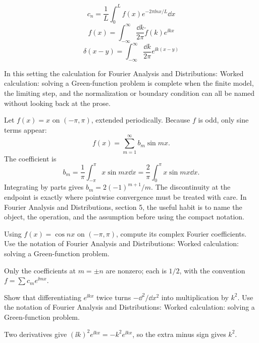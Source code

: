 \[
  c_n=\frac1L\int_0^L f(x)e^{-2\pi\ii nx/L}\dd x
\]
\[
  f(x)=\int_{-\infty}^{\infty}\frac{\dd k}{2\pi}\tilde f(k)e^{\ii kx}
\]
\[
  \delta(x-y)=\int_{-\infty}^{\infty}\frac{\dd k}{2\pi}e^{\ii k(x-y)}
\]

In this setting the calculation for Fourier Analysis and Distributions: Worked calculation: solving a Green-function problem is complete when the finite model, the limiting step, and the normalization or boundary condition can all be named without looking back at the prose.




\begin{example}
Let \(f(x)=x\) on \((-\pi,\pi)\), extended periodically.  Because \(f\) is odd, only sine terms appear:
\[
  f(x)=\sum_{m=1}^\infty b_m\sin mx.
\]
The coefficient is
\[
  b_m=\frac1\pi\int_{-\pi}^\pi x\sin mx\dd x
  =\frac2\pi\int_0^\pi x\sin mx\dd x.
\]
Integrating by parts gives \(b_m=2(-1)^{m+1}/m\).  The discontinuity at the endpoint is exactly where pointwise convergence must be treated with care.  In Fourier Analysis and Distributions, section 5, the useful habit is to name the object, the operation, and the assumption before using the compact notation.
\end{example}



\begin{exercise}
Using \(f(x)=\cos nx\) on \((-\pi,\pi)\), compute its complex Fourier coefficients.  Use the notation of Fourier Analysis and Distributions: Worked calculation: solving a Green-function problem.
\begin{answer}
Only the coefficients at \(m=\pm n\) are nonzero; each is \(1/2\), with the convention \(f=\sum c_me^{\ii mx}\).
\end{answer}
\end{exercise}

\begin{exercise}
Show that differentiating \(e^{\ii kx}\) twice turns \(-\dd^2/\dd x^2\) into multiplication by \(k^2\).  Use the notation of Fourier Analysis and Distributions: Worked calculation: solving a Green-function problem.
\begin{answer}
Two derivatives give \((\ii k)^2e^{\ii kx}=-k^2e^{\ii kx}\), so the extra minus sign gives \(k^2\).
\end{answer}
\end{exercise}



